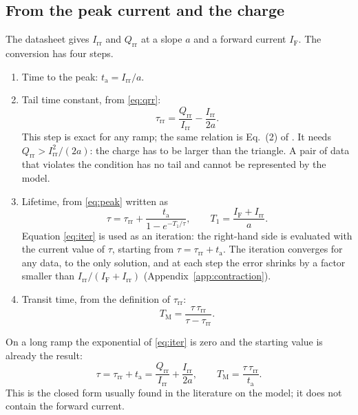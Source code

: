 \documentclass[10pt,a4paper]{scrartcl}
\newcommand{\IF}{I_\mathrm{F}}
\newcommand{\Irr}{I_\mathrm{rr}}
\newcommand{\Qrr}{Q_\mathrm{rr}}
\newcommand{\ta}{t_\mathrm{a}}
\newcommand{\taurr}{\tau_\mathrm{rr}}
\newcommand{\TM}{T_\mathrm{M}}
\newcommand{\Tone}{T_1}
\begin{document}
\subsection{From the peak current and the charge}
\label{sec:invpq}
The datasheet gives $\Irr$ and $\Qrr$ at a slope $a$ and a forward current $\IF$. The conversion has four steps.
\begin{enumerate}
\item Time to the peak: $\ta = \Irr/a$.
\item Tail time constant, from \eqref{eq:qrr}:
\begin{equation}
\taurr = \frac{\Qrr}{\Irr} - \frac{\Irr}{2a} .
\label{eq:taurr}
\end{equation}
This step is exact for any ramp; the same relation is Eq.~(2) of \cite{an6481}. It needs $\Qrr > \Irr^2/(2a)$: the charge has to be larger than the triangle. A pair of data that violates the condition has no tail and cannot be represented by the model.
\item Lifetime, from \eqref{eq:peak} written as
\begin{equation}
\tau = \taurr + \frac{\ta}{1 - e^{-\Tone/\tau}} , \qquad \Tone = \frac{\IF+\Irr}{a} .
\label{eq:iter}
\end{equation}
Equation \eqref{eq:iter} is used as an iteration: the right-hand side is evaluated with the current value of $\tau$, starting from $\tau = \taurr + \ta$. The iteration converges for any data, to the only solution, and at each step the error shrinks by a factor smaller than $\Irr/(\IF+\Irr)$ (Appendix~\ref{app:contraction}).
\item Transit time, from the definition of $\taurr$:
\begin{equation}
\TM = \frac{\tau\,\taurr}{\tau - \taurr} .
\label{eq:tm}
\end{equation}
\end{enumerate}
On a long ramp the exponential of \eqref{eq:iter} is zero and the starting value is already the result:
\begin{equation}
\tau = \taurr + \ta = \frac{\Qrr}{\Irr} + \frac{\Irr}{2a} , \qquad \TM = \frac{\tau\,\taurr}{\ta} .
\label{eq:longinv}
\end{equation}
This is the closed form usually found in the literature on the model; it does not contain the forward current.
\end{document}
